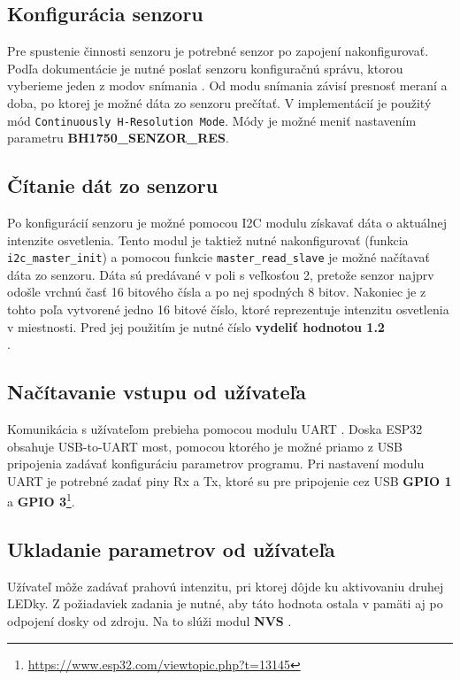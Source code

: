 \documentclass[a4paper]{article}
\begin{document}
\subsection{Konfigurácia senzoru}
Pre spustenie činnosti senzoru je potrebné senzor po zapojení nakonfigurovať. Podľa dokumentácie \cite[str. 4]{sensordoc} je nutné poslať senzoru konfiguračnú správu, ktorou vyberieme
jeden z modov snímania \cite[str. 5]{sensordoc}. Od modu snímania závisí presnosť meraní a doba, po ktorej je možné dáta zo senzoru prečítať. V implementácií je použitý mód \texttt{Continuously H-Resolution Mode}. Módy je možné meniť nastavením parametru \textbf{BH1750\_SENZOR\_RES}. 

\subsection{Čítanie dát zo senzoru}
Po konfigurácií senzoru je možné pomocou I2C modulu\cite{I2Cdoc} získavať dáta o aktuálnej intenzite osvetlenia. Tento modul je taktiež nutné nakonfigurovať (funkcia \texttt{i2c\_master\_init}) a 
pomocou funkcie \texttt{master\_read\_slave} je možné načítavať dáta zo senzoru. Dáta sú predávané v poli s veľkosťou 2, pretože senzor najprv odošle vrchnú časť 16 bitového čísla a po nej spodných 8 
bitov. Nakoniec je z tohto poľa vytvorené jedno 16 bitové číslo, ktoré reprezentuje intenzitu osvetlenia v miestnosti. Pred jej použitím je nutné číslo \textbf{vydeliť hodnotou 1.2}\\\cite[str. 7]{sensordoc}.

\subsection{Načítavanie vstupu od užívateľa}
Komunikácia s užívateľom prebieha pomocou modulu UART \cite{UARTdoc}. Doska ESP32 obsahuje USB-to-UART most, pomocou ktorého je možné priamo z USB pripojenia zadávať konfiguráciu parametrov programu.
Pri nastavení modulu UART je potrebné zadať piny Rx a Tx, ktoré su pre pripojenie cez USB \textbf{GPIO 1} a \textbf{GPIO 3}\footnote{\href{https://www.esp32.com/viewtopic.php?t=13145}{https://www.esp32.com/viewtopic.php?t=13145}}.

\subsection{Ukladanie parametrov od užívateľa}
Užívateľ môže zadávať prahovú intenzitu, pri ktorej dôjde ku aktivovaniu druhej LEDky. Z požiadaviek zadania je nutné, aby táto hodnota ostala v pamäti aj po odpojení dosky od zdroju.
Na to slúži modul \textbf{NVS} \cite{NVSdoc}.
\end{document}
